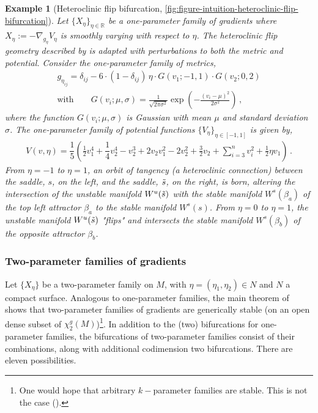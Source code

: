 \documentclass[12pt]{article}
\newtheorem{example}{Example}
\newcommand\colorAutoref[1]{{\hypersetup{linkcolor=blue}\autoref{#1}}}  %
\begin{document}
\begin{example}[Heteroclinic flip bifurcation, \colorAutoref{fig:figure-intuition-heteroclinic-flip-bifurcation}]
\label{example:heteroclinic-flip}
Let $\{ X_{\eta} \}_{\eta\in \mathbb{R}}$ be a one-parameter family of gradients where $X_{\eta} := -\nabla_{g_{\eta}} V_{\eta}$ is smoothly varying with respect to $\eta$. The heteroclinic flip geometry described by \cite{raju2024geometrical} is adapted with perturbations to both the metric and potential. Consider the one-parameter family of metrics,
\begin{gather*}
    g_{\eta_{ij}} = \delta_{ij} - 6 \cdot (1 - \delta_{ij}) \, \eta \cdot G(v_1; -1, 1) \cdot G(v_2; 0, 2) \\
    \mathrm{with } \qquad G(v_i; \mu, \sigma) = \frac{1}{\sqrt{2 \pi \sigma^2}} \exp\left(-\frac{(v_i - \mu)^2}{2 \sigma^2}\right) \, ,
\end{gather*}
where the function $G(v_i; \mu, \sigma)$ is Gaussian with mean $\mu$ and standard deviation $\sigma$. The one-parameter family of potential functions $\{V_{\eta}\}_{\eta \in [-1,1]}$ is given by,
\begin{gather*}
    \label{equation:example-heteroclinic-flip-associative-memory}
    V(v, \eta) = \dfrac{1}{5} \left( \frac{1}{2} v_{1}^{4} + \dfrac{1}{4} v_{2}^{4} - v_{2}^{3} + 2 v_{2}v_{1}^{2} - 2 v_{2}^{2} + \frac{3}{2}v_{2} + \sum_{i=3}^{n} v_{i}^{2} + \frac{1}{2}\eta v_{1} \right) \, .
\end{gather*}
From $\eta=-1$ to $\eta=1$, an orbit of tangency (a heteroclinic connection) between the saddle, $s$, on the left, and the saddle, $\Tilde{s}$, on the right, is born, altering the intersection of the unstable manifold $W^u(\Tilde{s})$ with the stable manifold $W^s(\beta_a)$ of the top left attractor $\beta_a$ to the stable manifold $W^s(s)$. From $\eta=0$ to $\eta=1$, the unstable manifold $W^u(\Tilde{s})$ "flips" and intersects the stable manifold $W^s(\beta_b)$ of the opposite attractor $\beta_b$.
\end{example}



\subsubsection{Two-parameter families of gradients}
\label{subsubsection:two-parameter-families-gradients}
Let $\{ X_{\eta} \}$ be a two-parameter family on $M$, with $\eta = (\eta_1,\eta_2) \in N$ and $N$ a compact surface. Analogous to one-parameter families, the main theorem of \cite{dias1989bifurcations} shows that two-parameter families of gradients are generically stable (on an open dense subset of $\chi_2^g(M)$)\footnote{One would hope that arbitrary $k-$parameter families are stable. This is not the case (\cite{takens1985moduli}).}. In addition to the (two) bifurcations for one-parameter families, the bifurcations of two-parameter families consist of their combinations, along with additional codimension two bifurcations.  There are eleven possibilities. 
\end{document}
